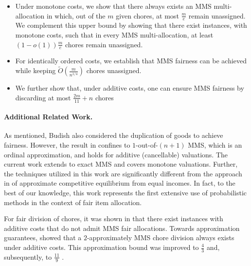  \begin{itemize}
 \item Under monotone costs, we show that there always exists an MMS multi-allocation in which, out of the $m$ given chores, at most $\frac{m}{e}$ remain unassigned. We complement this upper bound by showing that there exist instances, with monotone costs, such that in every MMS multi-allocation, at least $(1- o(1))\frac{m}{e}$ chores remain unassigned.
\item For identically ordered costs, %
we establish that MMS fairness can be achieved while keeping $\widetilde{O} \left(\frac{m}{n^{1/4}} \right)$ chores unassigned. 
\item We further show that, under additive costs, one can ensure MMS fairness by discarding at most $\frac{2m}{11} + n$ chores
\end{itemize} 
 
\paragraph{Additional Related Work.}
As mentioned, Budish \cite{7c65302b-f079-361a-94f1-0c3c9f6fc76b} also considered the duplication of goods to achieve fairness. However, the result in \cite{7c65302b-f079-361a-94f1-0c3c9f6fc76b} confines to $1$-out-of-$(n+1)$ MMS, which is an ordinal approximation, and holds for additive (cancellable) valuations. The current work extends to exact MMS and covers monotone valuations. Further, the techniques utilized in this work are significantly different from the approach in \cite{7c65302b-f079-361a-94f1-0c3c9f6fc76b} of approximate competitive equilibrium from equal incomes. In fact, to the best of our knowledge, this work represents the first extensive use of probabilistic methods in the context of fair item allocation.

For fair division of chores, it was shown in \cite{Aziz_Rauchecker_Schryen_Walsh_2017} that there exist instances with additive costs that do not admit MMS fair allocations. Towards approximation guarantees, \cite{Aziz_Rauchecker_Schryen_Walsh_2017} showed that a $2$-approximately MMS chore division always exists under additive costs. This approximation bound was improved to $\frac{4}{3}$ \cite{barman2020approximation} and, subsequently, to $\frac{11}{9}$ \cite{10.1145/3465456.3467555}.
